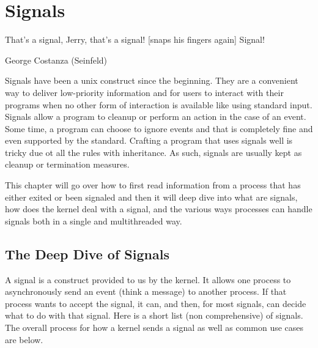 \chapter{Signals}

\epigraph{That's a signal, Jerry, that's a signal! [snaps his fingers again] Signal!}{George Costanza (Seinfeld)}

Signals have been a unix construct since the beginning. They are a convenient way to deliver low-priority information and for users to interact with their programs when no other form of interaction is available like using standard input. Signals allow a program to cleanup or perform an action in the case of an event. Some time, a program can choose to ignore events and that is completely fine and even supported by the standard. Crafting a program that uses signals well is tricky due ot all the rules with inheritance. As such, signals are usually kept as cleanup or termination measures.

This chapter will go over how to first read information from a process that has either exited or been signaled and then it will deep dive into what are signals, how does the kernel deal with a signal, and the various ways processes can handle signals both in a single and multithreaded way.

\section{The Deep Dive of Signals}

A signal is a construct provided to us by the kernel. It allows one process to asynchronously send an event (think a message) to another process. If that process wants to accept the signal, it can, and then, for most signals, can decide what to do with that signal. Here is a short list (non comprehensive) of signals. The overall process for how a kernel sends a signal as well as common use cases are below.


